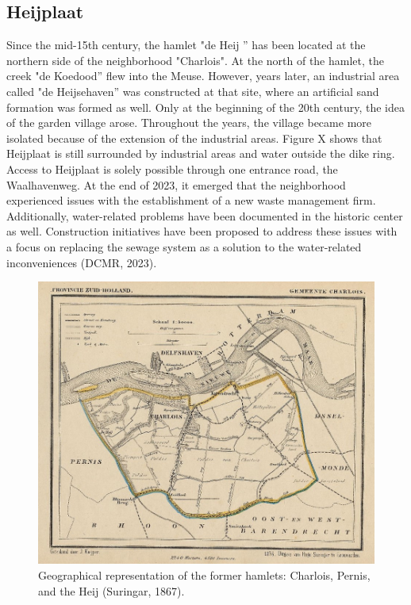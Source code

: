 \newpage

\subsection{Heijplaat}
Since the mid-15th century, the hamlet "de Heij '' has been located at the northern side of the neighborhood "Charlois". At the north of the hamlet, the creek "de Koedood'' flew into the Meuse. However, years later, an industrial area called "de Heijsehaven'' was constructed at that site, where an artificial sand formation was formed as well. Only at the beginning of the 20th century, the idea of the garden village arose. Throughout the years, the village became more isolated because of the extension of the industrial areas. Figure X shows that Heijplaat is still surrounded by industrial areas and water outside the dike ring. Access to Heijplaat is solely possible through one entrance road, the Waalhavenweg. At the end of 2023, it emerged that the neighborhood experienced issues with the establishment of a new waste management firm. Additionally, water-related problems have been documented in the historic center as well. Construction initiatives have been proposed to address these issues with a focus on replacing the sewage system as a solution to the water-related inconveniences (DCMR, 2023). 

\begin{figure}[htbp]
    \centering
    \includegraphics[width=0.60\linewidth]{figures/heij/charloisdeheij.jpeg}
    \caption{Geographical representation of the former hamlets: Charlois, Pernis, and the Heij (Suringar, 1867).}
\end{figure}

